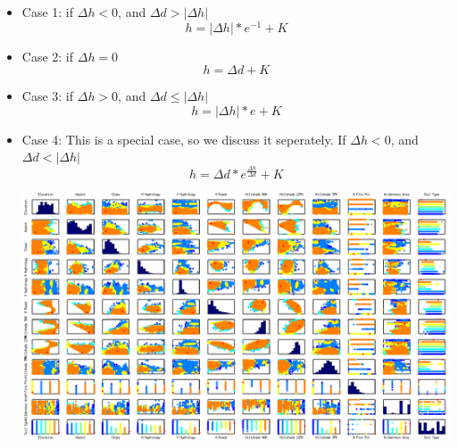 \documentclass[11pt]{article}  %
\begin{document}
\begin{itemize}
\item Case 1: if $\Delta h < 0$, and $\Delta d > |\Delta h|$
\begin{equation}
h = \left| \Delta h \right |*e^{-1} + K
\end{equation}

\item Case 2: if $\Delta h = 0$
\begin{equation}
h = \Delta d + K
\end{equation}

\item Case 3: if $\Delta h > 0$, and $\Delta d \leq \left | \Delta h \right |$
\begin{equation}
h = \left| \Delta h \right |*e + K
\end{equation}

\item Case 4: This is a special case, so we discuss it seperately. If $\Delta h < 0$, and $\Delta d < |\Delta h|$
\begin{equation}
h = \Delta d * e^\frac{\Delta h}{\Delta d} + K
\end{equation}

\includegraphics[scale=0.4]{featureScatterPlotMatrixHD}
\end{itemize}
\end{document}
